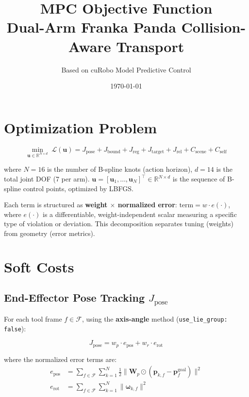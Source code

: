 \documentclass[11pt,a4paper]{article}
\begin{document}
\title{MPC Objective Function \\ Dual-Arm Franka Panda Collision-Aware Transport}
\author{Based on cuRobo Model Predictive Control}
\date{\today}
\maketitle

\section{Optimization Problem}

\begin{equation}
\min_{\mathbf{u} \in \mathbb{R}^{N \times d}} \;
\mathcal{L}(\mathbf{u}) =
J_{\text{pose}} + J_{\text{bound}} + J_{\text{reg}} + J_{\text{target}} + J_{\text{rel}}
+ C_{\text{scene}} + C_{\text{self}}
\label{eq:full}
\end{equation}

where $N = 16$ is the number of B-spline knots (action horizon),
$d = 14$ is the total joint DOF (7 per arm).
$\mathbf{u} = [\mathbf{u}_1, \ldots, \mathbf{u}_N]^\top \in \mathbb{R}^{N \times d}$
is the sequence of B-spline control points, optimized by LBFGS.

Each term is structured as \textbf{weight $\times$ normalized error}:
$\text{term} = w \cdot e(\cdot)$, where $e(\cdot)$ is a differentiable, weight-independent
scalar measuring a specific type of violation or deviation. This decomposition separates
tuning (weights) from geometry (error metrics).

\section{Soft Costs}

\subsection{End-Effector Pose Tracking $J_{\text{pose}}$}

For each tool frame $f \in \mathcal{F}$, using the \textbf{axis-angle} method
(\texttt{use\_lie\_group: false}):

\begin{equation}
J_{\text{pose}} = w_p \cdot e_{\text{pos}} + w_r \cdot e_{\text{rot}}
\label{eq:pose}
\end{equation}

where the normalized error terms are:
%
\begin{align}
e_{\text{pos}} &= \sum_{f \in \mathcal{F}} \sum_{k=1}^{N}
\frac{1}{2} \bigl\lVert \mathbf{W}_p \odot (\mathbf{p}_{k,f} - \mathbf{p}_f^{\text{goal}}) \bigr\rVert^2
\label{eq:epos} \\
e_{\text{rot}} &= \sum_{f \in \mathcal{F}} \sum_{k=1}^{N}
\lVert\boldsymbol{\omega}_{k,f}\rVert^2
\label{eq:erot}
\end{align}
\end{document}
